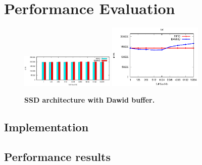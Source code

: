\section{Performance Evaluation}


\begin{figure}[t]
    \centering{}
    \includegraphics[width=0.4\textwidth]{expr/micro/sw.eps}
    \includegraphics[width=0.4\textwidth]{expr/micro/rw.eps}
    \caption{\textbf{SSD architecture with Dawid buffer.}}
    \label{fig_spartan_archi}
\end{figure}


\subsection{Implementation}

\subsection{Performance results}
